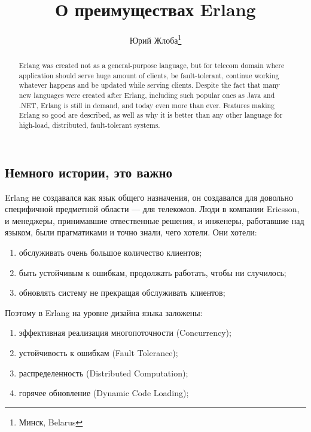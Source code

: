 \documentclass[10pt, a5paper]{article}
\begin{document}
\title{О преимуществах Erlang}%

\author{Юрий Жлоба\footnote{Минск, Belarus}}
\maketitle

\begin{abstract}
Erlang was created not as a general-purpose language, but for telecom domain where application should serve huge amount of clients, be fault-tolerant,  continue working whatever happens and be updated while serving clients.
Despite the fact that many new languages were created after Erlang, including such popular ones as Java and .NET, Erlang is still in demand, and today even more than ever.
Features making Erlang so good are described, as well as why it is better than any other language for high-load, distributed, fault-tolerant systems.
\end{abstract}


\subsection*{Немного истории, это важно}

Erlang не создавался как язык общего назначения, он создавался для довольно специфичной предметной области --- для телекомов. Люди в компании Ericsson, и менеджеры, принимавшие отвественные решения, и инженеры, работавшие над языком, были прагматиками и точно знали, чего хотели. Они хотели:

\begin{enumerate}
  \item обслуживать очень большое количество клиентов;
  \item быть устойчивым к ошибкам, продолжать работать, чтобы ни случилось;
  \item обновлять систему не прекращая обслуживать клиентов;
\end{enumerate}

Поэтому в Erlang на уровне дизайна языка заложены:

\begin{enumerate}
  \item эффективная реализация многопоточности (Concurrency);
  \item устойчивость к ошибкам (Fault Tolerance);
  \item распределенность (Distributed Computation);
  \item горячее обновление (Dynamic Code Loading);
\end{enumerate}
\end{document}
